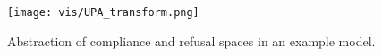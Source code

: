 \begin{figure}[H]
    \centering
    \texttt{[image: vis/UPA\_transform.png]}
    \caption{Abstraction of compliance and refusal spaces in an example model.}
    \label{fig:compliance_refusal}
\end{figure}